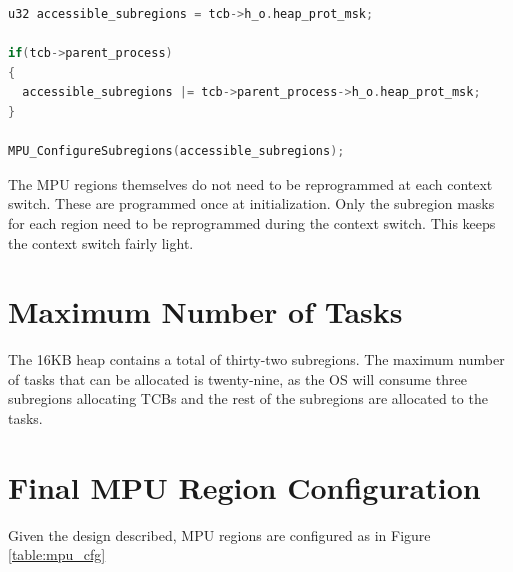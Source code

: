 \begin{lstlisting}[language=c, caption={Pseudo-code demonstrating how subregions are made accessible based on the TCB \textit{and} PCB.}, captionpos=b, label={lst:subregions}, float]
u32 accessible_subregions = tcb->h_o.heap_prot_msk;

if(tcb->parent_process)
{
  accessible_subregions |= tcb->parent_process->h_o.heap_prot_msk;
}

MPU_ConfigureSubregions(accessible_subregions);

\end{lstlisting}

The MPU regions themselves do not need to be reprogrammed at each context switch. These are programmed once at initialization. Only the subregion masks for each region need to be reprogrammed during the context switch. This keeps the context switch fairly light.

\section{Maximum Number of Tasks}

The 16KB heap contains a total of thirty-two subregions. The maximum number of tasks that can be allocated is twenty-nine, as the OS will consume three subregions allocating TCBs and the rest of the subregions are allocated to the tasks.

\section{Final MPU Region Configuration}

Given the design described, MPU regions are configured as in Figure \ref{table:mpu_cfg}




